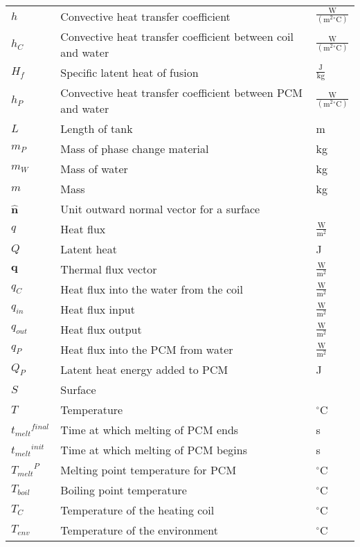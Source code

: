 \documentclass[12pt]{article}
\begin{document}
\begin{longtabu}{l X[l] l}
\\
$h$ & Convective heat transfer coefficient & $\frac{\text{W}}{(\text{m}^{2}{}^{\circ}\text{C})}$
\\
${h_{C}}$ & Convective heat transfer coefficient between coil and water & $\frac{\text{W}}{(\text{m}^{2}{}^{\circ}\text{C})}$
\\
${H_{f}}$ & Specific latent heat of fusion & $\frac{\text{J}}{\text{kg}}$
\\
${h_{P}}$ & Convective heat transfer coefficient between PCM and water & $\frac{\text{W}}{(\text{m}^{2}{}^{\circ}\text{C})}$
\\
$L$ & Length of tank & m
\\
${m_{P}}$ & Mass of phase change material & kg
\\
${m_{W}}$ & Mass of water & kg
\\
$m$ & Mass & kg
\\
$\mathbf{\hat{n}}$ & Unit outward normal vector for a surface & 
\\
$q$ & Heat flux & $\frac{\text{W}}{\text{m}^{2}}$
\\
$Q$ & Latent heat & J
\\
$\mathbf{q}$ & Thermal flux vector & $\frac{\text{W}}{\text{m}^{2}}$
\\
${q_{C}}$ & Heat flux into the water from the coil & $\frac{\text{W}}{\text{m}^{2}}$
\\
${q_{in}}$ & Heat flux input & $\frac{\text{W}}{\text{m}^{2}}$
\\
${q_{out}}$ & Heat flux output & $\frac{\text{W}}{\text{m}^{2}}$
\\
${q_{P}}$ & Heat flux into the PCM from water & $\frac{\text{W}}{\text{m}^{2}}$
\\
${Q_{P}}$ & Latent heat energy added to PCM & J
\\
$S$ & Surface & 
\\
$T$ & Temperature & ${}^{\circ}$C
\\
${{t_{melt}}^{final}}$ & Time at which melting of PCM ends & s
\\
${{t_{melt}}^{init}}$ & Time at which melting of PCM begins & s
\\
${{T_{melt}}^{P}}$ & Melting point temperature for PCM & ${}^{\circ}$C
\\
${T_{boil}}$ & Boiling point temperature & ${}^{\circ}$C
\\
${T_{C}}$ & Temperature of the heating coil & ${}^{\circ}$C
\\
${T_{env}}$ & Temperature of the environment & ${}^{\circ}$C
\\

\end{longtabu}
\end{document}
